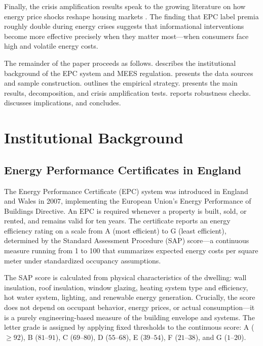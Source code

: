 \documentclass[12pt]{article}
\begin{document}
Finally, the crisis amplification results speak to the growing literature on how energy price shocks reshape housing markets \citep{romani2024crisis}. The finding that EPC label premia roughly double during energy crises suggests that informational interventions become more effective precisely when they matter most---when consumers face high and volatile energy costs.

The remainder of the paper proceeds as follows.  describes the institutional background of the EPC system and MEES regulation.  presents the data sources and sample construction.  outlines the empirical strategy.  presents the main results, decomposition, and crisis amplification tests.  reports robustness checks.  discusses implications, and  concludes.


\section{Institutional Background}\label{sec:background}

\subsection{Energy Performance Certificates in England}

The Energy Performance Certificate (EPC) system was introduced in England and Wales in 2007, implementing the European Union's Energy Performance of Buildings Directive. An EPC is required whenever a property is built, sold, or rented, and remains valid for ten years. The certificate reports an energy efficiency rating on a scale from A (most efficient) to G (least efficient), determined by the Standard Assessment Procedure (SAP) score---a continuous measure running from 1 to 100 that summarizes expected energy costs per square meter under standardized occupancy assumptions.

The SAP score is calculated from physical characteristics of the dwelling: wall insulation, roof insulation, window glazing, heating system type and efficiency, hot water system, lighting, and renewable energy generation. Crucially, the score does not depend on occupant behavior, energy prices, or actual consumption---it is a purely engineering-based measure of the building envelope and systems. The letter grade is assigned by applying fixed thresholds to the continuous score: A ($\geq 92$), B ($81$--$91$), C ($69$--$80$), D ($55$--$68$), E ($39$--$54$), F ($21$--$38$), and G ($1$--$20$).
\end{document}
